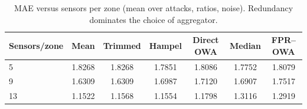 \begin{table}[!tbp]
\centering
\caption{MAE versus sensors per zone (mean over attacks, ratios, noise). Redundancy dominates the choice of aggregator.}
\label{tab:sensors}
\footnotesize
\begin{tabular}{lcccccc}
\toprule
\textbf{Sensors/zone} & \textbf{Mean} & \textbf{Trimmed} & \textbf{Hampel} & \textbf{Direct OWA} & \textbf{Median} & \textbf{FPR--OWA} \\
\midrule
5 & 1.8268 & 1.8268 & 1.7851 & 1.8086 & 1.7752 & 1.8079 \\
9 & 1.6309 & 1.6309 & 1.6987 & 1.7120 & 1.6907 & 1.7517 \\
13 & 1.1522 & 1.1568 & 1.1554 & 1.1798 & 1.3116 & 1.2919 \\
\bottomrule
\end{tabular}
\end{table}
